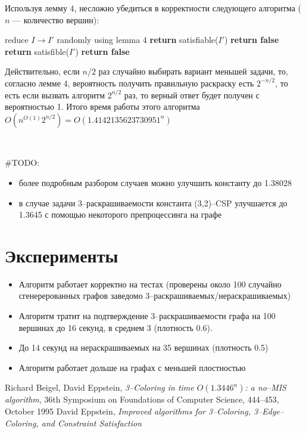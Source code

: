 \documentclass[fleqn]{article}
\theoremstyle{plain}
\theoremstyle{plain}
\theoremstyle{plain}
\theoremstyle{definition}
\begin{document}
Используя лемму 4, несложно убедиться в корректности следующего алгоритма ($n$ --- количество вершин):
\begin{algorithm}[H]
  \begin{algorithmic}[1]
				\State reduce $I \rightarrow I'$ randomly using lemma 4
				\State \textbf{return} satisfiable($I'$)
				\State \textbf{return false}
			\Else
				\State \textbf{return} satisfible($I'$)
			\EndIf
    	\EndFor
    	\State \textbf{return false}
    \EndFunction
  \end{algorithmic}
\end{algorithm}

Действительно, если $n/2$ раз случайно выбирать вариант меньшей задачи, то, согласно лемме 4, вероятность получить правильную раскраску есть $2^{-n/2}$, то есть если вызвать алгоритм $2^{n/2}$ раз, то верный ответ будет получен с вероятностью 1. Итого время работы этого алгоритма $O(n^{O(1)}2^{n/2}) = O(1.4142135623730951^n)$


\

\#TODO: 
\begin{itemize}
	\item более подробным разбором случаев можно улучшить константу до 1.38028
	\item в случае задачи 3--раскрашиваемости константа (3,2)--CSP улучшается до 1.3645 с помощью некоторого препроцессинга на графе
\end{itemize} 

\section{Эксперименты}
\begin{itemize}
	\item Алгоритм работает корректно на тестах (проверены около 100 случайно сгенерерованных графов заведомо 3--раскрашиваемых/нераскрашиваемых)
	\item Алгоритм тратит на подтверждение 3--раскрашиваемости графа на 100 вершинах до 16 секунд, в среднем 3 (плотность 0.6).
	\item До 14 секунд на нераскрашиваемых на 35 вершинах (плотность 0.5)
	\item Алгоритм работает дольше на графах с меньшей плостностью
\end{itemize}
\begin{thebibliography}{}
     Richard Beigel, David Eppstein, \emph{3--Coloring in time $O(1.3446^n)$: a no--MIS algorithm}, 36th Symposium on Foundations of Computer Science, 444--453, October 1995
     David Eppstein, \emph{Improved algorithms for 3--Coloring, 3--Edge--Coloring, and Constraint Satisfaction} 
\end{thebibliography}
\end{document}
